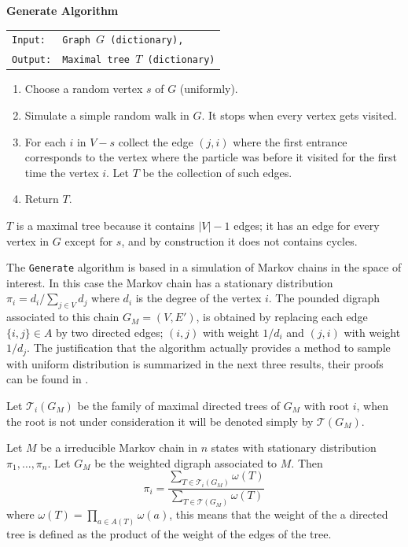 \begin{cajita}
\textbf{Generate Algorithm}\hfill \break
\begin{tabular}{ l l }
\texttt{Input:} &  \texttt{Graph $G$ (dictionary),} \\
\texttt{Output:} & \texttt{Maximal tree $T$ (dictionary)} \\
\end{tabular}

\begin{enumerate}
\item Choose a random vertex $s$ of $G$ (uniformly).
\item Simulate a simple random walk in $G$. It stops when every vertex gets visited. 
\item For each $i$ in $V-s$ collect the edge $(j,i)$ where the first entrance corresponds to the vertex where the particle was before it visited for the first time the vertex $i$. Let $T$ be the collection of such edges.
\item Return $T$.
\end{enumerate}
\end{cajita}

$T$ is a maximal tree because it contains $|V| - 1$ edges; it has an edge for every vertex in $G$ except for $s$, and by construction it does not contains cycles.

The \texttt{Generate} algorithm is based in a simulation of Markov chains in the space of interest. In this case the Markov chain has a stationary distribution $\pi_{i}=d_{i}/\sum_{j\in V} d_{j}$ where $d_{i}$ is the degree of the vertex $i$. The pounded digraph associated to this chain $G_M =(V,E')$, is obtained by replacing each edge $\{i,j\}\in A$ by two directed edges; $(i,j)$ with weight $1/d_{i}$ and $(j,i)$ with weight $1/d_{j}$. The justification that the algorithm actually provides a method to sample with uniform distribution is summarized in the next three results, their proofs can be found in \cite{Broder89}.

Let $\mathcal{T}_{i}(G_{M})$ be the family of maximal directed trees of $G_{M}$ with root $i$, when the root is not under consideration it will be denoted simply by $\mathcal{T}(G_{M})$.

\begin{theorem}
Let $M$ be a irreducible Markov chain in $n$ states with stationary distribution $\pi_1, \dots, \pi_n$. Let $G_{M}$ be the weighted digraph associated to $M$. Then $$\pi_{i} = \frac{\sum_{ T \in \mathcal{T}_{i}(G_{M})} \omega (T)}{\sum _{T \in \mathcal{T}(G_{M})} \omega (T)}$$
where $\omega(T) = \prod_{a\in A(T)}\omega(a)$, this means that the weight of the a directed tree is defined as the product of the weight of the edges of the tree.
\end{theorem}

